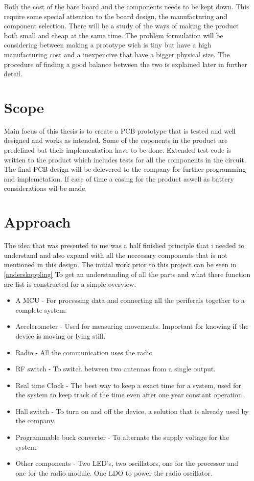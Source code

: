 Both the cost of the bare board and the components needs to be kept down.  This require some special attention to the board design, the manufacturing and component selection.
There will be a study of the ways of making the product both small and cheap at the same time. The problem formulation will be considering between making a prototype wich is tiny but have a high manufacturing cost and a inexpencive that have a bigger physical size. The procedure of finding a good balance between the two is explained later in further detail.

\section{Scope}
Main focus of this thesis is to create a PCB prototype that is tested and well designed and works as intended. Some of the coponents in the product are predefined but their implementation have to be done.
Extended test code is written to the product which includes tests for all the components in the circuit.  
The final PCB design will be delevered to the company for further programming and implemetation.
If case of time a casing for the product aswell as battery considerations wil be made.

\section{Approach}
The idea that was presented to me was a half finished principle that i needed to understand and also expand with all the neccesary components that is not mentioned in this design. The initial work prior to this project can be seen in \autoref{anderskoppling}
To get an understanding of all the parts and what there function are list is constructed for a simple overview.

\begin{itemize}[noitemsep]
	\item A MCU - For processing data and connecting all the periferals together to a complete system.
	\item Accelerometer - Used for measuring movements. Important for knowing if the device is moving or lying still.
	\item Radio - All the communication uses the radio 
	\item RF switch - To switch between two antennas from a single output.
	\item Real time Clock - The best way to keep a exact time for a system, used for the system to keep track of the time even after one year constant operation. 
	\item Hall switch - To turn on and off the device, a solution that is already used by the company.
	\item Programmable buck converter - To alternate the supply voltage for the system. 
	\item Other components - Two LED's, two oscillators, one for the processor and one for the radio module. One LDO to power the radio oscillator. 
\end{itemize}


